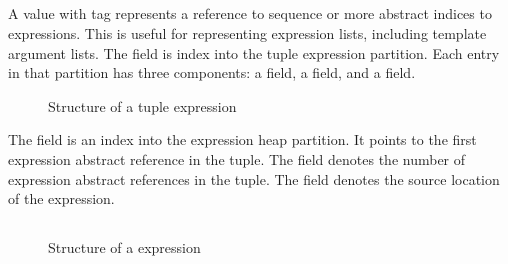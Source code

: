 

\subsection{}
\label{sec:ifc:ExprSort:Tuple}

A  value with tag  represents a reference
to sequence or more abstract indices to expressions.  This is useful for representing expression lists,
including template argument lists.
The  field is index into the tuple expression partition.
Each entry in that partition has three components: a  field, a  field, and a  field.
%
\begin{figure}[H]
	\centering
	\caption{Structure of a tuple expression}
	\label{fig:ifc-tuple-expression-structure}
\end{figure}
%
The  field is an index into the expression heap partition. It points to the first expression abstract reference in the tuple.
The  field denotes the number of expression abstract references in the tuple.
The  field denotes the source location of the expression.



\subsection{}
\label{sec:ifc:ExprSort:Nullptr}

\begin{figure}[H]
	\centering
	\caption{Structure of a  expression}
	\label{fig:ifc-nullptr-expr-structure}
\end{figure}


\subsection{}
\label{sec:ifc:ExprSort:This}

